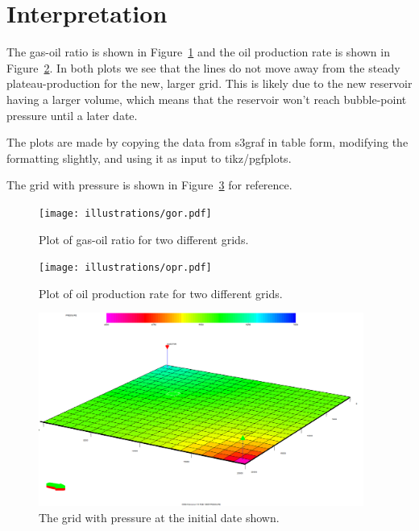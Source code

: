 \section{Interpretation} %
\label{sec:interpretation}
The gas-oil ratio is shown in Figure~\ref{fig:gor} and the oil production rate is shown in Figure~\ref{fig:opr}. In both plots we see that the lines do not move away from the steady plateau-production for the new, larger grid. This is likely due to the new reservoir having a larger volume, which means that the reservoir won't reach bubble-point pressure until a later date.

The plots are made by copying the data from s3graf in table form, modifying the formatting slightly, and using it as input to tikz/pgfplots.

The grid with pressure is shown in Figure~\ref{fig:grid} for reference.



\begin{figure}[htbp]
  \centering
  \texttt{[image: illustrations/gor.pdf]}
  \caption{Plot of gas-oil ratio for two different grids.}
  \label{fig:gor}
\end{figure}

\begin{figure}[htbp]
  \centering
  \texttt{[image: illustrations/opr.pdf]}
  \caption{Plot of oil production rate for two different grids.}
  \label{fig:opr}
\end{figure}

\begin{figure}[htbp]
  \centering
  \includegraphics[width=0.95\textwidth]{illustrations/grid.png}
  \caption{The grid with pressure at the initial date shown.}
  \label{fig:grid}
\end{figure}


